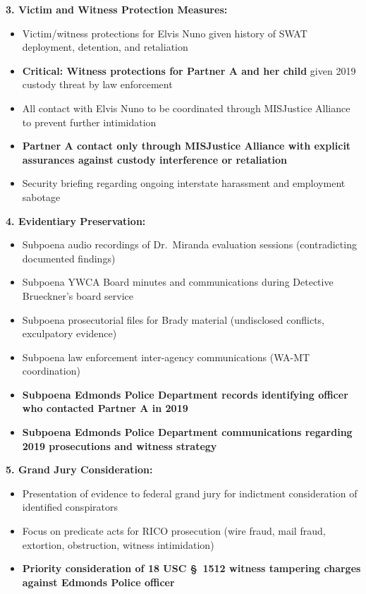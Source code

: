 \documentclass[11pt, letterpaper]{article}
\newcommand{\subsectiontitle}[1]{\vspace{0.15in}\noindent\textcolor{NavyBlue}{\textbf{#1}}\vspace{0.05in}}
\begin{document}
\subsectiontitle{3. Victim and Witness Protection Measures:}
\begin{itemize}[leftmargin=*,itemsep=2pt]
    \item Victim/witness protections for Elvis Nuno given history of SWAT deployment, detention, and retaliation
    \item \textbf{Critical: Witness protections for Partner A and her child} given 2019 custody threat by law enforcement
    \item All contact with Elvis Nuno to be coordinated through MISJustice Alliance to prevent further intimidation
    \item \textbf{Partner A contact only through MISJustice Alliance with explicit assurances against custody interference or retaliation}
    \item Security briefing regarding ongoing interstate harassment and employment sabotage
\end{itemize}

\subsectiontitle{4. Evidentiary Preservation:}
\begin{itemize}[leftmargin=*,itemsep=2pt]
    \item Subpoena audio recordings of Dr.\ Miranda evaluation sessions (contradicting documented findings)
    \item Subpoena YWCA Board minutes and communications during Detective Brueckner's board service
    \item Subpoena prosecutorial files for Brady material (undisclosed conflicts, exculpatory evidence)
    \item Subpoena law enforcement inter-agency communications (WA-MT coordination)
    \item \textbf{Subpoena Edmonds Police Department records identifying officer who contacted Partner A in 2019}
    \item \textbf{Subpoena Edmonds Police Department communications regarding 2019 prosecutions and witness strategy}
\end{itemize}

\subsectiontitle{5. Grand Jury Consideration:}
\begin{itemize}[leftmargin=*,itemsep=2pt]
    \item Presentation of evidence to federal grand jury for indictment consideration of identified conspirators
    \item Focus on predicate acts for RICO prosecution (wire fraud, mail fraud, extortion, obstruction, witness intimidation)
    \item \textbf{Priority consideration of 18 USC \S\ 1512 witness tampering charges against Edmonds Police officer}
\end{itemize}
\end{document}
